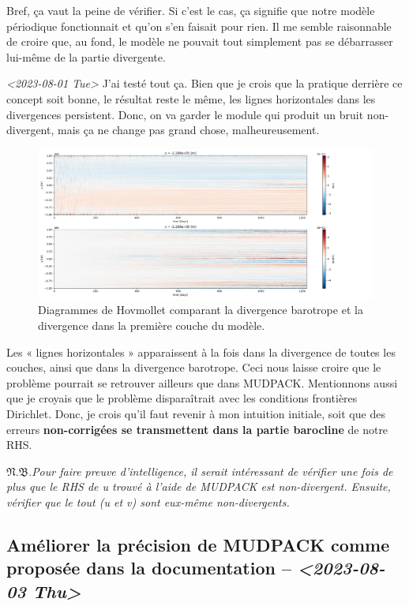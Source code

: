 \documentclass[10pt]{article}
\numberwithin{equation}{section}
\newcommand{\pt}{\hspace{1pt}} %
\newcommand{\nb}{\underline{{\footnotesize\EightStarConvex}\pt $\mathfrak{N.B.}$\vphantom{p}}\hspace{3pt}}
\begin{document}
Bref, ça vaut la peine de vérifier.
Si c'est le cas, ça signifie que notre modèle périodique fonctionnait et qu'on s'en faisait pour rien.
Il me semble raisonnable de croire que, au fond, le modèle ne pouvait tout simplement pas se débarrasser lui-même de la partie divergente.\bigskip

\textit{<2023-08-01 Tue> } J'ai testé tout ça.
Bien que je crois que la pratique derrière ce concept soit bonne, le résultat reste le même, les lignes horizontales dans les divergences persistent.
Donc, on va garder le module qui produit un bruit non-divergent, mais ça ne change pas grand chose, malheureusement.

\begin{figure}[htbp]
\centering
\includegraphics[width=.9\linewidth]{figures/debuggage/2023_08_03_comp_divergences.png}
\caption{Diagrammes de Hovmollet comparant la divergence barotrope et la divergence dans la première couche du modèle.}
\end{figure}

Les « lignes horizontales » apparaissent à la fois dans la divergence de toutes les couches, ainsi que dans la divergence barotrope.
Ceci nous laisse croire que le problème pourrait se retrouver ailleurs que dans MUDPACK.
Mentionnons aussi que je croyais que le problème disparaîtrait avec les conditions frontières Dirichlet.
Donc, je crois qu'il faut revenir à mon intuition initiale, soit que des erreurs \textbf{non-corrigées se transmettent dans la partie barocline} de notre RHS.\bigskip

\nb \emph{Pour faire preuve d'intelligence, il serait intéressant de vérifier une fois de plus que le RHS de u trouvé à l'aide de MUDPACK est non-divergent.
Ensuite, vérifier que le tout (u et v) sont eux-même non-divergents.}


\subsection{Améliorer la précision de MUDPACK comme proposée dans la documentation -- \textit{<2023-08-03 Thu>}}
\label{sec:org4a740ed}
\end{document}
